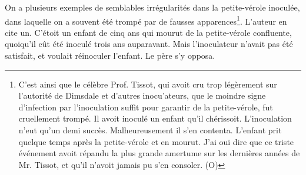 On a plusieurs exemples de semblables irrégularités dans la petite-vérole inoculée, dans laquelle on a souvent été trompé par de fausses apparences\footnote{C'est ainsi que le célèbre Prof. Tissot, qui avoit cru trop légèrement sur l'autorité de Dimsdale et d'autres inocu'ateurs, que le moindre signe d'infection par l'inoculation suffit pour garantir de la petite-vérole, fut cruellement trompé. Il avoit inoculé un enfant qu'il chérissoit. L'inoculation n'eut qu'un demi succès. Malheureusement il s'en contenta. L'enfant prit quelque temps après la petite-vérole et en mourut. J'ai ouï dire que ce triste événement avoit répandu la plus grande amertume sur les dernières années de Mr. Tissot, et qu'il n'avoit jamais pu s'en consoler. (O)}. L'auteur en cite un. C'étoit un enfant de cinq ans qui mourut de\setcounter{page}{365} la petite-vérole confluente, quoiqu'il eût été inoculé trois ans auparavant. Mais l'inoculateur n'avait pas été satisfait, et voulait réinoculer l'enfant. Le père s'y opposa.
